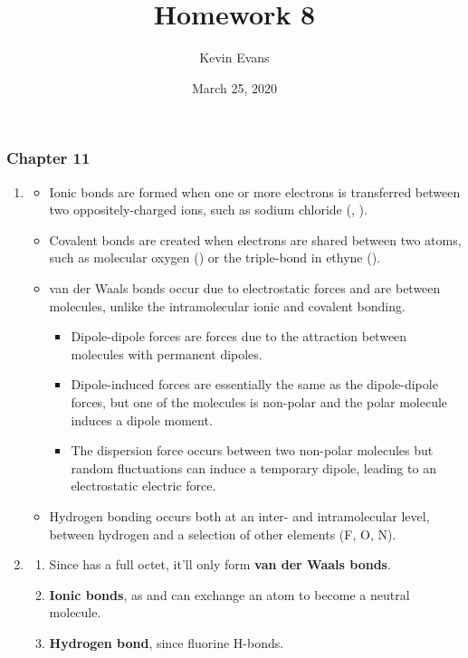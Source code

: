 \documentclass{homework}
\title{Homework 8}
\author{Kevin Evans}
\date{March 25, 2020}
\begin{document}
	\maketitle
	\subsubsection*{Chapter 11}
	\begin{enumerate}[label={\arabic*.}]
		\item \begin{itemize}
			\item Ionic bonds are formed when one or more electrons is transferred between two oppositely-charged ions, such as sodium chloride (, ).
			\item Covalent bonds are created when electrons are shared between two atoms, such as molecular oxygen () or the triple-bond in ethyne ().
			\item van der Waals bonds occur due to electrostatic forces and are between molecules, unlike the intramolecular ionic and covalent bonding. \begin{itemize}
				\item Dipole-dipole forces are forces due to the attraction between molecules with permanent dipoles.
				\item Dipole-induced forces are essentially the same as the dipole-dipole forces, but one of the molecules is non-polar and the polar molecule induces a dipole moment.
				\item The dispersion force occurs between two non-polar molecules but random fluctuations can induce a temporary dipole, leading to an electrostatic electric force.
			\end{itemize}
			\item Hydrogen bonding occurs both at an inter- and intramolecular level, between hydrogen and a selection of other elements (F, O, N).
		\end{itemize}
		\item \begin{enumerate}
			\item Since  has a full octet, it'll only form \textbf{van der Waals bonds}.
			\item \textbf{Ionic bonds}, as  and  can exchange an atom to become a neutral molecule.
			\item \textbf{Hydrogen bond}, since fluorine H-bonds.
		\end{enumerate}
	

\end{enumerate}
\end{document}
